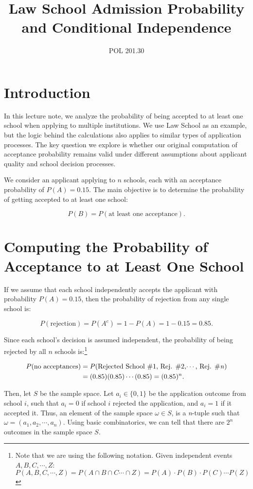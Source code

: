 \documentclass{article}
\title{Law School Admission Probability and Conditional Independence}
\author{POL 201.30}
\date{}
\begin{document}
\maketitle

\section{Introduction}

In this lecture note, we analyze the probability of being accepted to at least one school when applying to multiple institutions. We use Law School as an example, but the logic behind the calculations also applies to similar types of application processes. The key question we explore is whether our original computation of acceptance probability remains valid under different assumptions about applicant quality and school decision processes.

We consider an applicant applying to \( n \)  schools, each with an acceptance probability of \( P(A) = 0.15 \). The main objective is to determine the probability of getting accepted to at least one school:

\[
P(B) = P(\text{at least one acceptance}).
\]

\section{Computing the Probability of Acceptance to at Least One School}

If we assume that each school independently accepts the applicant with probability \( P(A) = 0.15 \), then the probability of rejection from any single school is:

\[
P(\text{rejection}) = P(A^c) = 1 - P(A) = 1 - 0.15 = 0.85.
\]

Since each school's decision is assumed independent, the probability of being rejected by all \( n \) schools is:\footnote{Note that we are using the following notation. Given independent events $A,B, C, \cdots, Z$: $P(A,B,C, \cdots , Z) = P(A \cap B \cap C \cdots \cap Z) = P(A) \cdot P(B) \cdot P(C) \cdots P(Z)$}

\begin{align*}
P(\text{no acceptances}) &= P(\text{Rejected School \#1, Rej. \#2,$\cdots$, Rej. \#\emph{n}} ) \\
 &= (0.85) (0.85) \cdots (0.85) = (0.85)^n.
\end{align*}

Then, let $S$ be the sample space. Let $a_i\in \{0,1\}$ be the application outcome from school $i$, such that $a_i=0$ if school $i$ rejected the application, and $a_i=1$ if it accepted it. Thus, an element of the sample space $\omega \in S$, is a \emph{n}-tuple such that $\omega = (a_1, a_2, \cdots, a_n)$. Using basic combinatorics, we can tell that there are $2^n$ outcomes in the sample space $S$.
\end{document}
